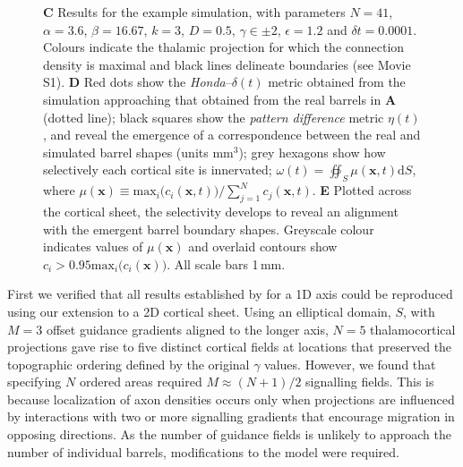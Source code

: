 \documentclass[9pt,lineno]{elife}
\newcommand{\cmnt}[1]{\textcolor{colcmnt}{#1}}
\newcommand{\MPtwo}[1]{\textcolor{colmptwo}{#1}}
\newcommand{\metrics}[1]{\textcolor{colmetrics}{#1}}
\newcommand{\mb}[1]{\mathbf{#1}}
\begin{document}
\begin{figure}
\begin{fullwidth}
{      \textbf{C} Results for the example simulation, with parameters
      \MPtwo{$N=41$, $\alpha=3.6$, $\beta=16.67$, $k=3$, $D=0.5$,
        $\gamma\in\pm 2$, $\epsilon=1.2$} and $\delta{t}=0.0001$. Colours
      indicate the thalamic projection for which the connection density is
      maximal and black lines delineate boundaries (see Movie S1).
      \textbf{D} Red dots show the \emph{Honda}--\metrics{$\delta(t)$} metric
      obtained from \metrics{the} simulation approaching that obtained from
      the \metrics{real} barrels in \textbf{A} (dotted line); black squares
      show the \emph{pattern difference} metric $\eta(t)$, and reveal the
      emergence of a correspondence between the real and simulated barrel
      shapes (units mm$^3$); \metrics{grey hexagons show how selectively each
        cortical site is innervated;
        $\omega(t) = \oiint_{S} \mu(\mb{x},t) \mathrm{d}S$, where
        $\mu(\mb{x}) \equiv \mathrm{max}_i\big(c_i(\mb{x},t)\big)\big/\sum_{j=1}^{N} c_j(\mb{x},t)$.}
      \textbf{E} \metrics{Plotted across the cortical sheet, the selectivity
        develops to reveal an alignment with the emergent barrel boundary
        shapes}. \metrics{Greyscale colour indicates values of $\mu(\mb{x})$
        and overlaid contours show $c_i > 0.95
        \mathrm{max}_i\big(c_i(\mb{x})\big)$.} All scale bars 1\,mm.}
    \label{fig:main}
  \end{fullwidth}
\end{figure}

First we verified that all results established by \cite{karbowski_model_2004}
for a 1D axis could be reproduced using our extension to a 2D cortical
sheet. Using an elliptical domain, $S$, with $M=3$ offset guidance gradients
aligned to the longer axis, $N=5$ thalamocortical projections gave rise to
five distinct cortical fields at locations that preserved the topographic
ordering defined by the original $\gamma$ values. However, we found that
specifying $N$ ordered areas required $M\approx (N+1)/2$ signalling
fields. This is because localization of axon densities occurs only when
projections are influenced by interactions with two or more signalling
gradients that encourage migration in opposing directions. As the number of
guidance fields is unlikely to approach the number of individual barrels,
\cmnt{modifications to the model} were required.
\end{document}
